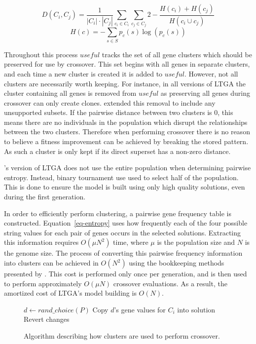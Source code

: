 \documentclass[twoside]{article}
\begin{document}
\begin{equation}
  D(C_i,C_j) = \frac{1}{\left | C_i \right |\cdot \left |C_j \right|}\sum_{c_i \in C_i}\sum_{c_j \in C_j}
  2 - \frac{H(c_i) + H(c_j)}{H(c_i \cup c_j)}
  \label{eq-distance}
\end{equation}
\begin{equation}
  H(c) = -\sum_{s\in S} p_c(s)\log(p_c(s))
  \label{eq-entropy}
\end{equation}

Throughout this process $useful$ tracks the set of all gene clusters which should be preserved for use by crossover.
This set begins with all genes in separate clusters, and each time a new cluster is created it is added to $useful$.
However, not all clusters are necessarily worth keeping. For instance, in all versions of LTGA the cluster
containing all genes is removed from $useful$ as preserving all genes during crossover can only create clones.
\cite{thierens:2013:ltgahiff} extended this removal to include any unsupported subsets. If the pairwise distance
between two clusters is 0, this means there are no individuals in the population which disrupt the relationships between the two
clusters. Therefore when performing crossover there is no reason to believe a fitness improvement can be achieved
by breaking the stored pattern. As such a cluster is only kept if its direct superset has a non-zero distance.

\cite{thierens:2013:ltgahiff}'s version of LTGA does not use the entire population when determining pairwise entropy.
Instead, binary tournament use used to select half of the population. This is done to ensure the model is built
using only high quality solutions, even during the first generation.

In order to efficiently perform clustering, a pairwise gene frequency table is constructed.
Equation~\ref{eq-entropy} uses how frequently each of the four possible string values for each
pair of genes occurs in the selected solutions. Extracting this information requires $O(\mu N^2)$
time, where $\mu$ is the population size and $N$ is the genome size. The process of converting
this pairwise frequency information into clusters can be achieved in $O(N^2)$ using the bookkeeping
methods presented by \cite{gronau:2007:upgma}. This cost is performed only once per generation,
and is then used to perform approximately $O(\mu N)$ crossover evaluations. As a result, the amortized cost of
LTGA's model building is $O(N)$.

\begin{figure}
  \begin{algorithmic}[1]
        \State $d \leftarrow rand\_choice(P)$\label{fig-cluster-usage-donate}
        \State Copy $d$'s gene values for $C_i$ into solution
            \State Revert changes
          \EndIf
        \EndIf
    \EndFor
  \EndProcedure
\end{algorithmic}
  \caption{Algorithm describing how clusters are used to perform crossover.}
  \label{fig-cluster-usage}
\end{figure}
\end{document}
